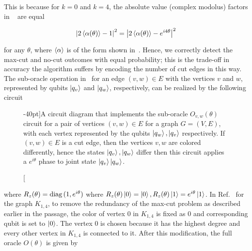 \clearpage
\noindent
This is because for $k=0$ and $k=4$, the absolute value (complex modolus) factors in ~ are equal

\begin{align}
	\abs{2\ev{\alpha(\theta)} - 1}^2 = \abs{2\ev{\alpha(\theta)} - e^{i4\theta}}^2
\end{align}

\noindent
for any $\theta$, where $\ev{\alpha}$ is of the form shown in~. Hence, we correctly detect the \acs{max-cut} and no-cut outcomes with equal probability; this is the trade-off in accuracy the algorithm suffers by encoding the number of cut edges in this way. The sub-oracle operation in~ for an edge $(v,w) \in E$ with the vertices $v$ and $w$, represented by qubits $\ket{q_v}$ and $\ket{q_w}$, respectively, can be realized by the following circuit~\cite{Satoh_2020}

\begin{figure}[h]
	\centering
	\caption[A circuit diagram that implements the sub-oracle $O_{v,w}(\theta)$ circuit for a vertex pair $(v,w) \in E$ in $G=(V,E)$.][-40pt]{A circuit diagram that implements the sub-oracle $O_{v,w}(\theta)$ circuit for a pair of vertices ${(v,w)\in E}$ for a graph ${G=(V,E)}$, with each vertex represented by the qubits $\ket{q_w}, \ket{q_v}$ respectively. If ${(v,w) \in E}$ is a cut edge, then the vertices ${v,w}$ are colored differently, hence the states $\ket{q_v},\ket{q_w}$ differ then this circuit applies a $e^{i\theta}$ phase to joint state ${\ket{q_v}\ket{q_w}}$.}  
\end{figure}

\noindent
where $R_z(\theta) = \operatorname{diag}{(1, e^{i \theta})}$ where $R_z(\theta)\ket{0} = \ket{0}, R_z(\theta)\ket{1}= e^{i\theta}\ket{1}$. In Ref.~\cite{Satoh_2020} for the graph $K_{1,4}$, to remove the redundancy of the \acs{max-cut} problem as described earlier in the passage, the color of vertex $0$ in $K_{1,4}$ is fixed as $0$ and corresponding qubit is set to $\ket{0}$. The vertex $0$ is chosen because it has the highest degree and every other vertex in $K_{1,4}$ is connected to it. After this modification, the full oracle $O(\theta)$ is given by

